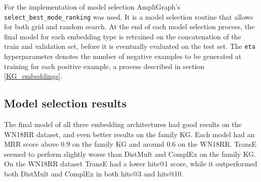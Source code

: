 For the implementation of model selection AmpliGraph's \texttt{select\_best\_mode\_ranking} was used. It is a model selection routine that allows for both grid and random search. At the end of each model selection process, the final model for each embedding type is retrained on the concatenation of the train and validation set, before it is eventually evaluated on the test set. The \texttt{eta} hyperparameter denotes the number of negative examples to be generated at training for each positive example, a process described in section \ref{KG_embeddings}. %

\subsection{Model selection results}
The final model of all three embedding architectures had good results on the WN18RR dataset, and even better results on the family KG. Each model had an MRR score above 0.9 on the family KG and around 0.6 on the WN18RR. TransE seemed to perform slightly worse than DistMult and ComplEx on the family KG. On the WN18RR dataset TransE had a lower hits@1 score, while it outperformed both DistMult and ComplEx in both hits@3 and hits@10.
